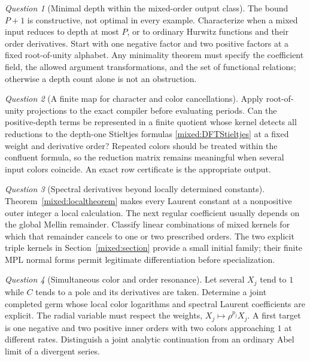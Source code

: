 \documentclass[11pt]{article}
\numberwithin{equation}{section}
\theoremstyle{plain}
\theoremstyle{definition}
\theoremstyle{remark}
\newtheorem{question}{Question}
\begin{document}
\begin{question}[Minimal depth within the mixed-order output class]
The bound $P+1$ is constructive, not optimal in every example.
Characterize when a mixed input reduces to depth at most $P$, or to
ordinary Hurwitz functions and their order derivatives. Start with
one negative factor and two positive factors at a fixed root-of-unity
alphabet. Any minimality theorem must specify the coefficient field,
the allowed argument transformations, and the set of functional
relations; otherwise a depth count alone is not an obstruction.
\end{question}

\begin{question}[A finite map for character and color cancellations]
Apply root-of-unity projections to the exact compiler before evaluating
periods. Can the positive-depth terms be represented in a finite
quotient whose kernel detects all reductions to the depth-one
Stieltjes formulas \eqref{mixed:DFTStieltjes} at a fixed weight and
derivative order? Repeated colors should be treated within the
confluent formula, so the reduction matrix remains meaningful when
several input colors coincide. An exact row certificate is the
appropriate output.
\end{question}

\begin{question}[Spectral derivatives beyond locally determined constants]
Theorem~\ref{mixed:localtheorem} makes every Laurent constant at a
nonpositive outer integer a local calculation. The next regular
coefficient usually depends on the global Mellin remainder. Classify
linear combinations of mixed kernels for which that remainder cancels
to one or two prescribed orders. The two explicit triple kernels
in Section~\ref{mixed:section} provide a small initial family;
their finite MPL normal forms permit legitimate differentiation
before specialization.
\end{question}

\begin{question}[Simultaneous color and order resonance]
Let several $X_j$ tend to $1$ while $C$ tends to a pole and its
derivatives are taken. Determine a joint completed germ whose local
color logarithms and spectral Laurent coefficients are explicit.
The radial variable must respect the weights,
$X_j\mapsto\rho^{p_j}X_j$. A first target is one negative and two
positive inner orders with two colors approaching $1$ at different
rates. Distinguish a joint analytic continuation from an ordinary
Abel limit of a divergent series.
\end{question}
\end{document}
